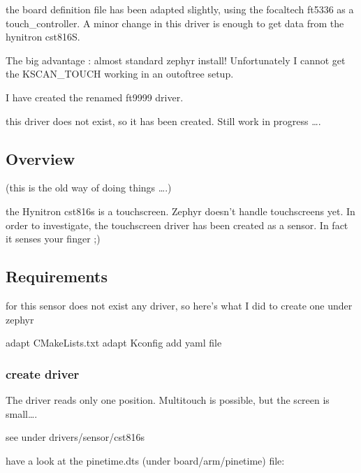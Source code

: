 \documentclass[letterpaper,10pt,english]{sphinxmanual}
\begin{document}
the board definition file has been adapted slightly, using the focaltech ft5336 as a touch\_controller. A minor change in this driver is enough to get data from the hynitron cst816S.

The big advantage : almost standard zephyr install!
Unfortunately I cannot get the KSCAN\_TOUCH working in an out\sphinxhyphen{}of\sphinxhyphen{}tree setup.

I have created the renamed ft9999 driver.

\begin{sphinxVerbatim}[commandchars=\\\{\}]
\end{sphinxVerbatim}

this driver does not exist, so it has been created.
Still work in progress ….


\subsection{Overview}
\label{\detokenize{drivers/cst816s:overview}}
(this is the old way of doing things ….)

the Hynitron cst816s is a touchscreen.
Zephyr doesn’t handle touchscreens yet.
In order to investigate, the touchscreen driver has been created as a sensor.
In fact it senses your finger ;)


\subsection{Requirements}
\label{\detokenize{drivers/cst816s:requirements}}
for this sensor does not exist any driver, so here’s what I did to create one under zephyr

adapt CMakeLists.txt
adapt Kconfig
add yaml file


\subsubsection{create driver}
\label{\detokenize{drivers/cst816s:create-driver}}
The driver reads only one position.
Multitouch is possible, but the screen is small….

see under drivers/sensor/cst816s

have a look at the pinetime.dts (under board/arm/pinetime) file:

\begin{sphinxVerbatim}[commandchars=\\\{\}]
\end{sphinxVerbatim}
\end{document}

